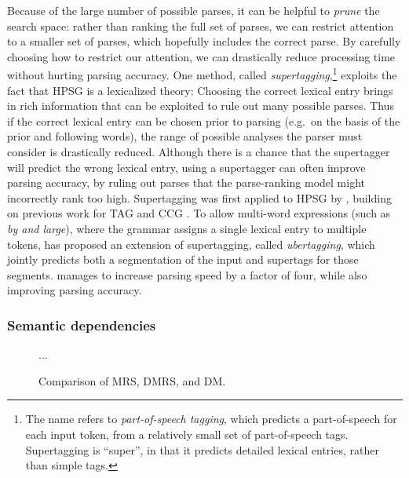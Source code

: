 \documentclass[output=paper]{langsci/langscibook}
\begin{document}
Because of the large number of possible parses,
it can be helpful to \textit{prune} the search space:
rather than ranking the full set of parses,
we can restrict attention to a smaller set of parses,
which hopefully includes the correct parse.
By carefully choosing how to restrict our attention,
we can drastically reduce processing time without hurting parsing accuracy.
One method, called \textit{supertagging},\footnote{%
	The name refers to \textit{part-of-speech tagging},
	which predicts a part-of-speech for each input token,
	from a relatively small set of part-of-speech tags.
	Supertagging is ``super'', in that it predicts detailed lexical entries, rather than simple tags.
}
exploits the fact that HPSG is a lexicalized theory: Choosing the correct lexical entry brings in rich information that can be exploited to rule out many possible parses.
Thus if the correct lexical entry can be chosen prior to parsing (e.g.\ on the basis of the prior and following words), the range of possible analyses the parser must consider is drastically reduced.
Although there is a chance that the supertagger will predict the wrong lexical entry,
using a supertagger can often improve parsing accuracy,
by ruling out parses that the parse-ranking model might incorrectly rank too high.
Supertagging was first applied to HPSG by \citet{matsuzaki2007supertag},
building on previous work for TAG \citep{bangalore1999supertag}
and CCG \citep{clark2004supertag}.
To allow multi-word expressions (such as \textit{by and large}),
where the grammar assigns a single lexical entry to multiple tokens,
\citet{dridan2013ubertag} has proposed an extension of supertagging, called \textit{ubertagging},
which jointly predicts both a segmentation of the input and supertags for those segments.
\citeauthor{dridan2013ubertag} manages to increase parsing speed by a factor of four,
while also improving parsing accuracy.


\subsubsection{Semantic dependencies}
\label{cl:prac:dep}


\begin{figure}
\centering
...
\caption{Comparison of MRS, DMRS, and DM.}
\label{cl:fig:dep}
\end{figure}
\end{document}
